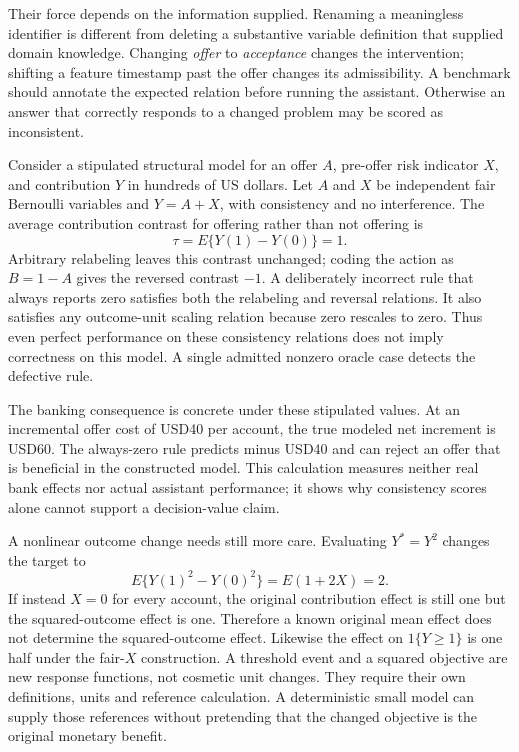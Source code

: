 Their force depends on the information supplied. Renaming a meaningless
identifier is different from deleting a substantive variable definition
that supplied domain knowledge. Changing \emph{offer} to \emph{acceptance}
changes the intervention; shifting a feature timestamp past the offer changes
its admissibility. A benchmark should annotate the expected relation before
running the assistant. Otherwise an answer that correctly responds to a
changed problem may be scored as inconsistent.

Consider a stipulated structural model for an offer \(A\), pre-offer risk
indicator \(X\), and contribution \(Y\) in hundreds of US dollars. Let \(A\)
and \(X\) be independent fair Bernoulli variables and \(Y=A+X\), with
consistency and no interference. The average contribution contrast for
offering rather than not offering is
\[
       \tau=E\{Y(1)-Y(0)\}=1.
\]
Arbitrary relabeling leaves this contrast unchanged; coding the action as
\(B=1-A\) gives the reversed contrast \(-1\). A deliberately incorrect
rule that always reports zero satisfies both the relabeling and reversal
relations. It also satisfies any outcome-unit scaling relation because
zero rescales to zero. Thus even perfect performance on these consistency
relations does not imply correctness on this model. A single admitted
nonzero oracle case detects the defective rule.

The banking consequence is concrete under these stipulated values. At an
incremental offer cost of USD40 per account, the true modeled net increment
is USD60. The always-zero rule predicts minus USD40 and can reject an offer
that is beneficial in the constructed model. This calculation measures
neither real bank effects nor actual assistant performance; it shows why
consistency scores alone cannot support a decision-value claim.
\citep{exec14_l7_exact}

A nonlinear outcome change needs still more care. Evaluating
\(Y^*=Y^2\) changes the target to
\[
 E\{Y(1)^2-Y(0)^2\}=E(1+2X)=2.
\]
If instead \(X=0\) for every account, the original contribution effect is
still one but the squared-outcome effect is one. Therefore a known original
mean effect does not determine the squared-outcome effect. Likewise the
effect on \(1\{Y\geq1\}\) is one half under the fair-\(X\) construction.
A threshold event and a squared objective are new response functions, not
cosmetic unit changes. They require their own definitions, units and
reference calculation. A deterministic small model can supply those
references without pretending that the changed objective is the original
monetary benefit.

